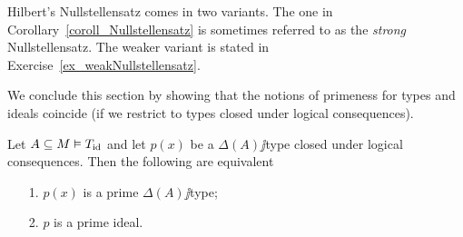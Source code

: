 \documentclass[creche.tex]{subfiles}
\begin{document}
Hilbert's Nullstellensatz comes in two variants. The one in Corollary~\ref{coroll_Nullstellensatz} is sometimes referred to as the \textit{strong\/}  Nullstellensatz. The weaker variant is stated in Exercise~\ref{ex_weakNullstellensatz}.




% 
% 
% 
% 
% 
% 


We conclude this section by showing that the notions of primeness for types and ideals coincide (if we restrict to types closed under logical consequences).

\begin{proposition}\label{prop_tipi_e_ideali_primi}
Let $A\subseteq M\models T_{\rm id}$ and let $p(x)$ be a $\Delta(A)\jj$type closed under logical consequences. Then the following are equivalent
\begin{itemize}
\item[1.] $p(x)$ is a prime $\Delta(A)\jj$type;
\item[2.] $p$ is a prime ideal.
\end{itemize}
\end{proposition}
\end{document}
